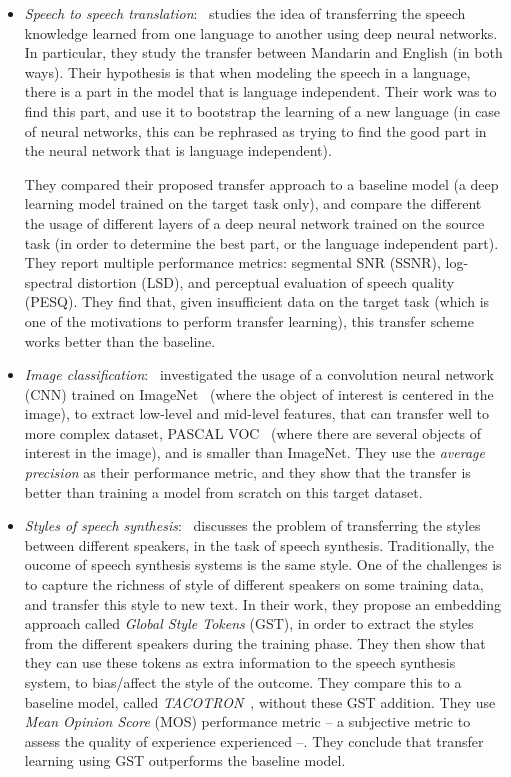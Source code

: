\begin{itemize}
      \item \textit{Speech to speech translation}:~\citep{xu2014cross} studies the idea of transferring the speech knowledge learned from one language to another using deep neural networks. In particular, they study the transfer between Mandarin and English (in both ways). Their hypothesis is that when modeling the speech in a language, there is a part in the model that is language independent. Their work was to find this part, and use it to bootstrap the learning of a new language (in case of neural networks, this can be rephrased as trying to find the good part in the neural network that is language independent).

      They compared their proposed transfer approach to a baseline model (a deep learning model trained on the target task only), and compare the different the usage of different layers of a deep neural network trained on the source task (in order to determine the best part, or the language independent part). They report multiple performance metrics: segmental SNR (SSNR), log-spectral distortion (LSD), and perceptual evaluation of speech quality (PESQ). They find that, given insufficient data on the target task (which is one of the motivations to perform transfer learning), this transfer scheme works better than the baseline.

      \item \textit{Image classification}:~\citep{oquab2014learning} investigated the usage of a convolution neural network (CNN) trained on ImageNet~\citep{imagenet_cvpr09} (where the object of interest is centered in the image), to extract low-level and mid-level features, that can transfer well to more complex dataset, PASCAL VOC~\citep{everingham2010pascal} (where there are several objects of interest in the image), and is smaller than ImageNet. They use the \textit{average precision} as their performance metric, and they show that the transfer is better than training a model from scratch on this target dataset.

      \item \textit{Styles of speech synthesis}:~\citep{wang2018style} discusses the problem of transferring the styles between different speakers, in the task of speech synthesis. Traditionally, the oucome of speech synthesis systems is the same style. One of the challenges is to capture the richness of style of different speakers on some training data, and transfer this style to new text. In their work, they propose an embedding approach called \textit{Global Style Tokens} (GST), in order to extract the styles from the different speakers during the training phase. They then show that they can use these tokens as extra information to the speech synthesis system, to bias/affect the style of the outcome.
      They compare this to a baseline model, called \textit{TACOTRON}~\citep{wang2017tacotron}, without these GST addition. They use \textit{Mean Opinion Score} (MOS) performance metric -- a subjective metric to assess the quality of experience experienced --. They conclude that transfer learning using GST outperforms the baseline model.

    \end{itemize}

